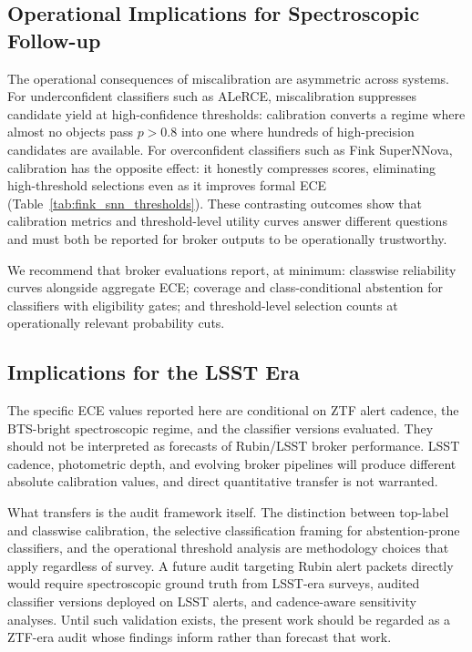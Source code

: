 \documentclass[twocolumn]{aastex631}
\begin{document}
\subsection{Operational Implications for Spectroscopic
Follow-up}\label{sec:disc_operational}

The operational consequences of miscalibration are asymmetric
across systems. For underconfident classifiers such as ALeRCE,
miscalibration suppresses candidate yield at high-confidence
thresholds: calibration converts a regime where almost no objects
pass $p > 0.8$ into one where hundreds of high-precision candidates
are available. For overconfident classifiers such as Fink
SuperNNova, calibration has the opposite effect: it honestly
compresses scores, eliminating high-threshold selections even as
it improves formal ECE (Table~\ref{tab:fink_snn_thresholds}).
These contrasting outcomes show that calibration metrics and
threshold-level utility curves answer different questions and
must both be reported for broker outputs to be operationally
trustworthy.

We recommend that broker evaluations report, at minimum:
classwise reliability curves alongside aggregate ECE; coverage
and class-conditional abstention for classifiers with eligibility
gates; and threshold-level selection counts at operationally
relevant probability cuts.

\subsection{Implications for the LSST Era}\label{sec:disc_lsst}

The specific ECE values reported here are conditional on ZTF
alert cadence, the BTS-bright spectroscopic regime, and the
classifier versions evaluated. They should not be interpreted as
forecasts of Rubin/LSST broker performance. LSST cadence,
photometric depth, and evolving broker pipelines will produce
different absolute calibration values, and direct quantitative
transfer is not warranted.

What transfers is the audit framework itself. The distinction
between top-label and classwise calibration, the selective
classification framing for abstention-prone classifiers, and
the operational threshold analysis are methodology choices that
apply regardless of survey. A future audit targeting Rubin alert
packets directly would require spectroscopic ground truth from
LSST-era surveys, audited classifier versions deployed on LSST
alerts, and cadence-aware sensitivity analyses. Until such
validation exists, the present work should be regarded as a
ZTF-era audit whose findings inform rather than forecast that work.
\end{document}
